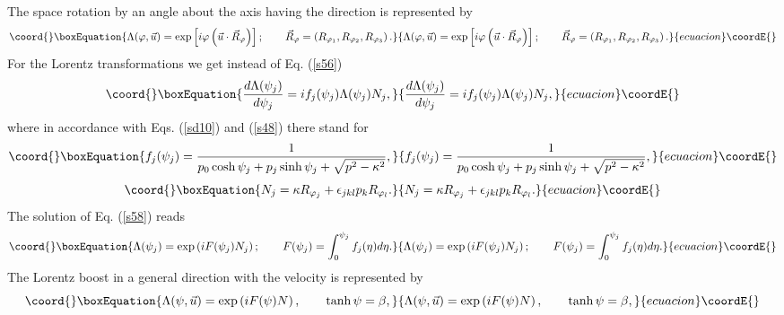 \documentclass[a4paper,a4paper]{article}
\begin{document}
The space rotation by an angle \myHighlight{$\varphi $}\coordHE{} about the axis having the
direction \coordHE{}  \coordHE{} is represented by 
\begin{equation}\coord{}\boxEquation{
\Lambda (\varphi ,\vec{u})=\exp \left[ i\varphi \left( \vec{u}\cdot \vec{R}
_{\varphi }\right) \right] ;\qquad \vec{R}_{\varphi }=\left( R_{\varphi
_{1}},R_{\varphi _{2}},R_{\varphi _{3}}\right) .  \label{sa57}
}{
\Lambda (\varphi ,\vec{u})=\exp \left[ i\varphi \left( \vec{u}\cdot \vec{R}
_{\varphi }\right) \right] ;\qquad \vec{R}_{\varphi }=\left( R_{\varphi
_{1}},R_{\varphi _{2}},R_{\varphi _{3}}\right) .  }{ecuacion}\coordE{}\end{equation}%
For the Lorentz transformations we get instead of Eq. (\ref{s56}) 
\begin{equation}\coord{}\boxEquation{
\frac{d\Lambda (\psi _{j})}{d\psi _{j}}=if_{j}(\psi _{j})\Lambda (\psi
_{j})N_{j},  \label{s58}
}{
\frac{d\Lambda (\psi _{j})}{d\psi _{j}}=if_{j}(\psi _{j})\Lambda (\psi
_{j})N_{j},  }{ecuacion}\coordE{}\end{equation}%
where in accordance with Eqs. (\ref{sd10}) and (\ref{s48}) there stand for 
\begin{equation}\coord{}\boxEquation{
f_{j}(\psi _{j})=\frac{1}{p_{0}\cosh \psi _{j}+p_{j}\sinh \psi _{j}+\sqrt{
p^{2}-\kappa ^{2}}},  \label{s59}
}{
f_{j}(\psi _{j})=\frac{1}{p_{0}\cosh \psi _{j}+p_{j}\sinh \psi _{j}+\sqrt{
p^{2}-\kappa ^{2}}},  }{ecuacion}\coordE{}\end{equation}%
\begin{equation}\coord{}\boxEquation{
N_{j}=\kappa R_{\varphi _{j}}+\epsilon _{jkl}p_{k}R_{\varphi _{l}}.
\label{sa59}
}{
N_{j}=\kappa R_{\varphi _{j}}+\epsilon _{jkl}p_{k}R_{\varphi _{l}}.
}{ecuacion}\coordE{}\end{equation}%
The solution of Eq. (\ref{s58}) reads 
\begin{equation}\coord{}\boxEquation{
\Lambda (\psi _{j})=\exp \left( iF(\psi _{j})N_{j}\right) ;\qquad F(\psi
_{j})=\int_{0}^{\psi _{j}}f_{j}(\eta )d\eta .  \label{s60}
}{
\Lambda (\psi _{j})=\exp \left( iF(\psi _{j})N_{j}\right) ;\qquad F(\psi
_{j})=\int_{0}^{\psi _{j}}f_{j}(\eta )d\eta .  }{ecuacion}\coordE{}\end{equation}%
The Lorentz boost in a general direction \coordHE{} with the velocity \myHighlight{$\beta $}\coordHE{}
is represented by 
\begin{equation}\coord{}\boxEquation{
\Lambda (\psi ,\vec{u})=\exp \left( iF(\psi )N\right) ,\qquad \tanh \psi
=\beta ,  \label{s61}
}{
\Lambda (\psi ,\vec{u})=\exp \left( iF(\psi )N\right) ,\qquad \tanh \psi
=\beta ,  }{ecuacion}\coordE{}\end{equation}%
\end{document}
